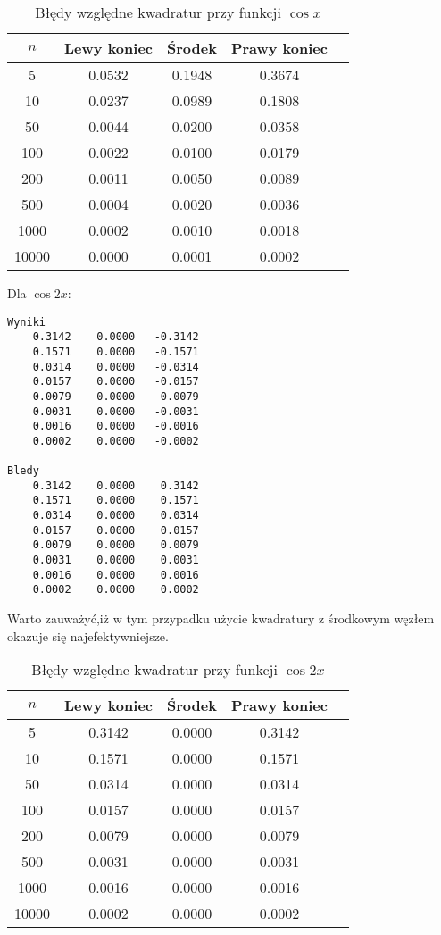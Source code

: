 \documentclass[12pt]{article}
\begin{document}
\begin{table}[!h]
\caption{\footnotesize Błędy względne kwadratur przy funkcji $\cos{x}$} %
\renewcommand{\arraystretch}{1.1}
\centering\begin{tabular}{|c|c|c|c|c|}
\hline $n$ & Lewy koniec & Środek & Prawy koniec \\
\hline      5 & 0.0532 & 0.1948 & 0.3674 \\
\hline     10 & 0.0237 & 0.0989 & 0.1808 \\
\hline     50 & 0.0044 & 0.0200 & 0.0358 \\
\hline    100 & 0.0022 & 0.0100 & 0.0179 \\
\hline    200 & 0.0011 & 0.0050 & 0.0089 \\
\hline    500 & 0.0004 & 0.0020 & 0.0036 \\
\hline   1000 & 0.0002 & 0.0010 & 0.0018 \\
\hline  10000 & 0.0000 & 0.0001 & 0.0002 \\
\hline
\end{tabular}
\label{Tabela z wynikami 2}
\end{table}

Dla $\cos{2x}$:
\begin{lstlisting}
Wyniki
    0.3142    0.0000   -0.3142
    0.1571    0.0000   -0.1571
    0.0314    0.0000   -0.0314
    0.0157    0.0000   -0.0157
    0.0079    0.0000   -0.0079
    0.0031    0.0000   -0.0031
    0.0016    0.0000   -0.0016
    0.0002    0.0000   -0.0002

Bledy
    0.3142    0.0000    0.3142
    0.1571    0.0000    0.1571
    0.0314    0.0000    0.0314
    0.0157    0.0000    0.0157
    0.0079    0.0000    0.0079
    0.0031    0.0000    0.0031
    0.0016    0.0000    0.0016
    0.0002    0.0000    0.0002
\end{lstlisting}

Warto zauważyć,iż w tym przypadku użycie kwadratury z środkowym węzłem okazuje się najefektywniejsze. 

\begin{table}[!h]
\caption{\footnotesize Błędy względne kwadratur przy funkcji $\cos{2x}$} %
\renewcommand{\arraystretch}{1.1}
\centering\begin{tabular}{|c|c|c|c|c|}
\hline $n$ & Lewy koniec & Środek & Prawy koniec \\
\hline      5 & 0.3142 & 0.0000 & 0.3142 \\
\hline     10 & 0.1571 & 0.0000 & 0.1571 \\
\hline     50 & 0.0314 & 0.0000 & 0.0314 \\
\hline    100 & 0.0157 & 0.0000 & 0.0157 \\
\hline    200 & 0.0079 & 0.0000 & 0.0079 \\
\hline    500 & 0.0031 & 0.0000 & 0.0031 \\
\hline   1000 & 0.0016 & 0.0000 & 0.0016 \\
\hline  10000 & 0.0002 & 0.0000 & 0.0002 \\
\hline
\end{tabular}
\label{Tabela z wynikami 3}
\end{table}
\end{document}
